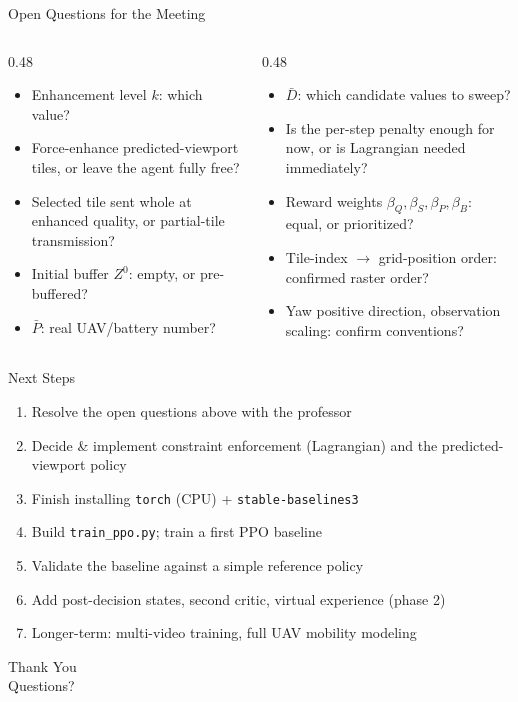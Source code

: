 \documentclass[aspectratio=169]{beamer}
\begin{document}
\begin{frame}{Open Questions for the Meeting}
  \footnotesize
  \begin{columns}[T]
    \begin{column}{0.48\textwidth}
      \begin{itemize}
        \item Enhancement level $k$: which value?
        \item Force-enhance predicted-viewport tiles, or leave the agent fully free?
        \item Selected tile sent whole at enhanced quality, or partial-tile transmission?
        \item Initial buffer $Z^0$: empty, or pre-buffered?
        \item $\bar P$: real UAV/battery number?
      \end{itemize}
    \end{column}
    \begin{column}{0.48\textwidth}
      \begin{itemize}
        \item $\bar D$: which candidate values to sweep?
        \item Is the per-step penalty enough for now, or is Lagrangian needed immediately?
        \item Reward weights $\beta_Q,\beta_S,\beta_P,\beta_B$: equal, or prioritized?
        \item Tile-index $\to$ grid-position order: confirmed raster order?
        \item Yaw positive direction, observation scaling: confirm conventions?
      \end{itemize}
    \end{column}
  \end{columns}
\end{frame}

\begin{frame}{Next Steps}
  \begin{enumerate}
    \item Resolve the open questions above with the professor
    \item Decide \& implement constraint enforcement (Lagrangian) and the predicted-viewport policy
    \item Finish installing \texttt{torch} (CPU) + \texttt{stable-baselines3}
    \item Build \texttt{train\_ppo.py}; train a first PPO baseline
    \item Validate the baseline against a simple reference policy
    \item Add post-decision states, second critic, virtual experience (phase 2)
    \item Longer-term: multi-video training, full UAV mobility modeling
  \end{enumerate}
\end{frame}

\begin{frame}
  \centering
  \vspace{2cm}
  {\Huge Thank You}\\[1em]
  {\large Questions?}
\end{frame}
\end{document}
